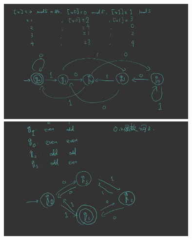 \documentclass[uplatex, 12pt, dvipdfmx]{jsarticle}
\begin{document}
\section{ }

\begin{center}\begin{figure}[h]\centering
    \includegraphics[width=10cm]{tmp-40.jpg}
    \includegraphics[width=10cm]{tmp-41.jpg}
\end{figure}\end{center}
\end{document}
